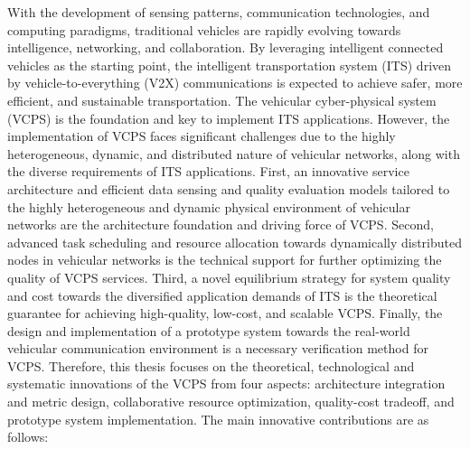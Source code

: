 \begin{eabstract}	%

With the development of sensing patterns, communication technologies, and computing paradigms, traditional vehicles are rapidly evolving towards intelligence, networking, and collaboration. By leveraging intelligent connected vehicles as the starting point, the intelligent transportation system (ITS) driven by vehicle-to-everything (V2X) communications is expected to achieve safer, more efficient, and sustainable transportation. The vehicular cyber-physical system (VCPS) is the foundation and key to implement ITS applications. However, the implementation of VCPS faces significant challenges due to the highly heterogeneous, dynamic, and distributed nature of vehicular networks, along with the diverse requirements of ITS applications. First, an innovative service architecture and efficient data sensing and quality evaluation models tailored to the highly heterogeneous and dynamic physical environment of vehicular networks are the architecture foundation and driving force of VCPS. Second, advanced task scheduling and resource allocation towards dynamically distributed nodes in vehicular networks is the technical support for further optimizing the quality of VCPS services. Third, a novel equilibrium strategy for system quality and cost towards the diversified application demands of ITS is the theoretical guarantee for achieving high-quality, low-cost, and scalable VCPS. Finally, the design and implementation of a prototype system towards the real-world vehicular communication environment is a necessary verification method for VCPS. Therefore, this thesis focuses on the theoretical, technological and systematic innovations of the VCPS from four aspects: architecture integration and metric design, collaborative resource optimization, quality-cost tradeoff, and prototype system implementation. The main innovative contributions are as follows:


\end{eabstract}
